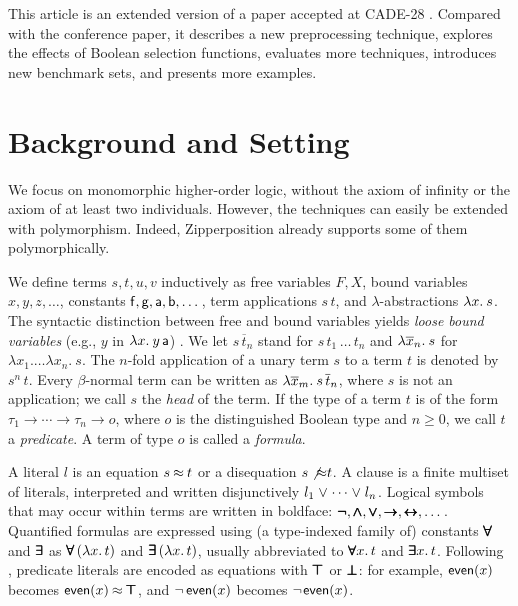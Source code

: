 \documentclass[smallcondensed,draft]{svjour3}     %
\begin{document}
This article is an extended version of a paper accepted at CADE-28
\cite{making-ho-work}. Compared with the conference paper, it
describes a new preprocessing technique, explores the effects of Boolean
selection functions, evaluates %
more techniques,
introduces new benchmark sets, and presents more examples.

\section{Background and Setting}
\label{sec:satfol:ho-tech:background}

We focus on monomorphic higher-order logic, without the axiom of infinity 
or the axiom of at least two individuals. However, the techniques can easily be
extended with polymorphism. Indeed, Zipperposition already supports some
of them polymorphically.

We define terms $s, t, u, v$ inductively as free variables $F, X$, bound
variables $x, y, z, \dotsc$, constants ${\mathsf{f}}, {\mathsf{g}},\allowbreak
{\mathsf{a}},\allowbreak {\mathsf{b}}, \dotsc$, term applications $s \, t$, and
$\lambda$-abstractions $\lambda x.\> s$. The syntactic distinction between free and
bound variables yields \emph{loose bound variables} (e.g., $y$ in $\lambda x.\> y \,
{\mathsf{a}}$) \cite{tn-93-patterns}.
We let $s \, \overline{t}_n$ stand for $s \, t_1 \, \ldots \, t_n$ and
$\lambda \overline{x}_n.\> s$ for $\lambda x_1. \ldots \lambda x_n. \> s$. The $n$-fold application of
a unary term $s$ to a term $t$ is denoted by $s^n \, t$. Every
$\beta$-normal term can be written as $\lambda \overline{x}_m.\> s \,
\overline{t}_n$, where $s$ is not an application; we call $s$ the \emph{head}
of the term. If the type of a term $t$ is of the form $\tau_1 \to \cdots \to
\tau_n \to o$, where $o$ is the distinguished Boolean type and $n \ge 0$, we
call $t$ a \emph{predicate}. A term of type $o$ is called a \emph{formula}.

A literal $l$ is an equation $s \mathbin{\approx} t$ or a disequation $s \not\mathbin{\approx} t$. A clause is
a finite multiset of literals, interpreted and written disjunctively $l_1 \mathrel\lor
\cdots \mathrel\lor l_n$. Logical symbols that may occur within terms are written in
boldface: $\pmb{\neg}, \pmb\land, \pmb\lor, \pmb\rightarrow, \pmb\leftrightarrow, \dots$. Quantified
formulas are expressed using (a type-indexed
family of) constants $\pmb\forall$ and $\pmb\exists$ as $\pmb\forall \,
(\lambda x. \, t)$ and $\pmb\exists \, (\lambda x. \, t)$, usually abbreviated to
$\pmb\forall x.\,t$ and $\pmb\exists x.\,t$. Following %
\osup{}, predicate literals are encoded as equations with $\pmb\top$ or
$\pmb\bot$: for example, ${\mathsf{even}}(x)$ becomes ${\mathsf{even}}(x) \mathbin{\approx} \pmb\top$, and
$\neg\,{\mathsf{even}}(x)$ becomes $\neg{\kern.2ex {\mathsf{even}}(x)}$.
\end{document}
